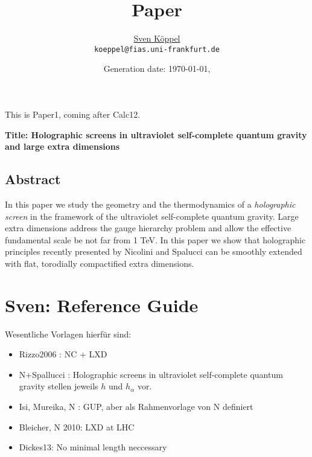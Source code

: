 \documentclass[10pt,a4paper, fleqn]{article}
\title{\vspace{-9ex} Paper \vspace{-1ex}} %
\author{\small %
\href{https://itp.uni-frankfurt.de/~koeppel}{Sven Köppel} \\
\small \texttt{koeppel@fias.uni-frankfurt.de}}
\date{\small Generation date: \today, \currenttime}
\begin{document}
\maketitle

\renewcommand{\d}{\mathrm{d}}
\newcommand{\dd}[2]{\frac{\mathrm{d} #1}{\mathrm{d} #2}}
\newcommand{\pp}[2]{\frac{\partial #1}{\partial #2}}
\renewcommand{\L}{L_P}
\newcommand{\pr}{p_r}
\newcommand{\psenk}{p_\perp}
\newcommand{\ebenso}{\biggl( ~ \therefore ~ \biggr) }
\newcommand{\metrik}[1]{\d s^2 = \left( #1 \right) \d t^2 \left( #1 \right)^{-1} \d r^2 + r^2 \d \Omega_{D-2}^2 }
\newcommand{\winkel}{r^2 \d \Omega^2}
\newcommand{\dann}{$\rightarrow~$}
\newcommand{\CA}{ {\cal A}}
\newcommand{\C}[1]{ {\cal #1}}
\newcommand{\mn}{_{\mu\nu}}
\newcommand{\surface}{\Omega_{n+2}}

\newcommand{\lesen}{ {\bf LESEN} }
\newcommand{\Ms}{M_\star}
\newcommand{\Ls}{L_\star}
\newcommand{\Gs}{G_\star}

\begin{multicols}{2}
This is Paper1, coming after Calc12.

{\bf Title:
Holographic screens in ultraviolet
self-complete quantum gravity and
large extra dimensions
}
\vfill

\columnbreak
\tableofcontents
\end{multicols}

\subsection*{Abstract}
In this paper we study the geometry and the thermodynamics of a
{\it holographic screen} in the framework of the ultraviolet
self-complete quantum gravity. Large extra dimensions address
the gauge hierarchy problem and allow the effective fundamental
scale be not far from 1 TeV. In this paper we show that
holographic principles recently presented by
Nicolini and Spalucci can be smoothly extended with flat,
torodially compactified extra dimensions.

\section*{Sven: Reference Guide}
Wesentliche Vorlagen hierfür sind:

\begin{itemize}
\item Rizzo2006 \cite{Rizzo}: NC + LXD
\item N+Spallucci \cite{NS2012, NS2013}: Holographic screens in ultraviolet self-complete quantum gravity stellen jeweils $h$ und $h_\alpha$ vor.
\item Isi, Mureika, N \cite{Isi1,Isi2}: GUP, aber als Rahmenvorlage von N definiert
\item Bleicher, N 2010: LXD at LHC
\item Dickes13: No minimal length neccessary
\end{itemize}
\end{document}
